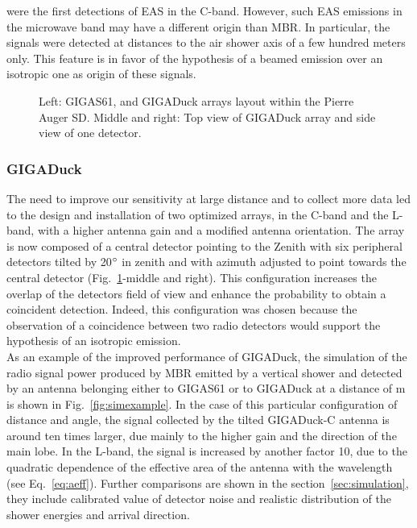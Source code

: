 were the  first detections  of EAS in  the C-band.  However,  such EAS
emissions in the microwave band  may have a different origin than MBR.
In  particular, the  signals were  detected  at distances  to the  air
shower axis of a few hundred meters only.  This feature is in favor of
the hypothesis of a beamed emission over an isotropic one as origin of
these signals.
\begin{figure}[!t]
  \centering
  \hspace*{-3ex}  
  \caption{Left: GIGAS61, and GIGADuck arrays layout within the Pierre
    Auger SD.  Middle and right: Top  view of GIGADuck  array and side
    view of one detector.}
  \label{fig:detector}  
\end{figure}

\subsubsection*{GIGADuck}
The need to  improve our sensitivity at large  distance and to collect
more data led to the  design and installation of two optimized arrays,
in  the C-band  and  the L-band,  with  a higher  antenna  gain and  a
modified antenna orientation.  The array  is now composed of a central
detector pointing  to the Zenith with six  peripheral detectors tilted
by  20$\rm ^{\circ} $  in zenith  and with  azimuth adjusted  to point
towards  the   central  detector  (Fig.~\ref{fig:detector}-middle  and
right).   This configuration  increases the  overlap of  the detectors
field  of view  and enhance  the  probability to  obtain a  coincident
detection.   Indeed,   this  configuration  was   chosen  because  the
observation of a coincidence between two radio detectors would support
the  hypothesis of  an isotropic  emission.   \\As an  example of  the
improved performance  of GIGADuck, the simulation of  the radio signal
power produced by MBR emitted by  a vertical shower and detected by an
antenna  belonging  either  to  \mbox{GIGAS61}  or to  GIGADuck  at  a
distance of  \unit[750]{m} is shown  in Fig.~\ref{fig:simexample}.  In
the case of  this particular configuration of distance  and angle, the
signal collected by the tilted \mbox{GIGADuck-C} antenna is around ten
times larger, due  mainly to the higher gain and  the direction of the
main lobe.  In  the L-band, the signal is  increased by another factor
10,  due to  the quadratic  dependence of  the effective  area  of the
antenna  with  the   wavelength  (see  Eq.~\eqref{eq:aeff}).   Further
comparisons  are  shown   in  the  section~\ref{sec:simulation},  they
include calibrated value of  detector noise and realistic distribution
of the shower energies and arrival direction.

